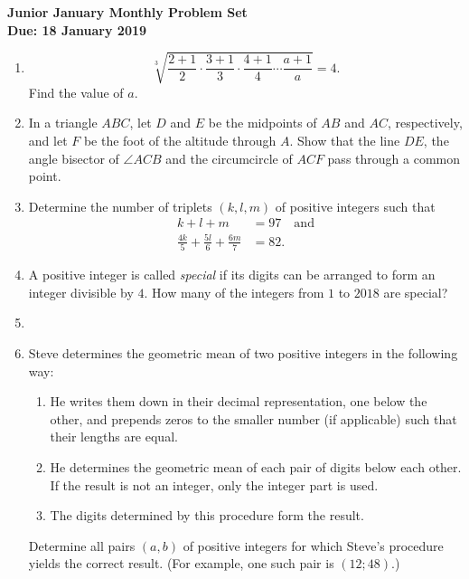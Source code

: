 \documentclass{article}
\begin{document}
\begin{center}
\textbf{\Large Junior January Monthly Problem Set}
\\ \vspace{1em}
\textbf{\large Due: 18 January 2019}
\end{center}

\begin{enumerate}[1.]

\vspace{6pt}
\item %
\[ \sqrt[3]{\frac{2+1}{2}\cdot\frac{3+1}{3}\cdot\frac{4+1}{4}\dotsm\frac{a+1}{a}} = 4. \]
Find the value of $a$.


\vspace{6pt}
\item %
In a triangle $ABC$, let $D$ and $E$ be the midpoints of $AB$ and $AC$, respectively, and let $F$ be the foot of the altitude through $A$. Show that the line $DE$, the angle bisector of $\angle ACB$ and the circumcircle of $ACF$ pass through a common point.


\vspace{6pt}
\item %
Determine the number of triplets $(k,l,m)$ of positive integers such that
\begin{align*}
  k+l+m &= 97 \quad \mathrm{and} \\
  \frac{4k}{5} +\frac{5l}{6} +\frac{6m}{7} &= 82.
\end{align*}


\vspace{6pt}
\item %
A positive integer is called \emph{special} if its digits can be arranged to form an integer divisible by $4$. How many of the integers from $1$ to $2018$ are special?


\vspace{6pt}
\item 


\vspace{6pt}
\item %
Steve determines the geometric mean of two positive integers in the following way:
\begin{enumerate}
	\item He writes them down in their decimal representation, one below the other, and prepends zeros to the smaller number (if applicable) such that their lengths are equal.
	\item He determines the geometric mean of each pair of digits below each other. If the result is not an integer, only the integer part is used.
	\item The digits determined by this procedure form the result.
\end{enumerate}
Determine all pairs $(a,b)$ of positive integers for which Steve's procedure yields the correct result. (For example, one such pair is $(12; 48)$.)



\end{enumerate}
\end{document}
